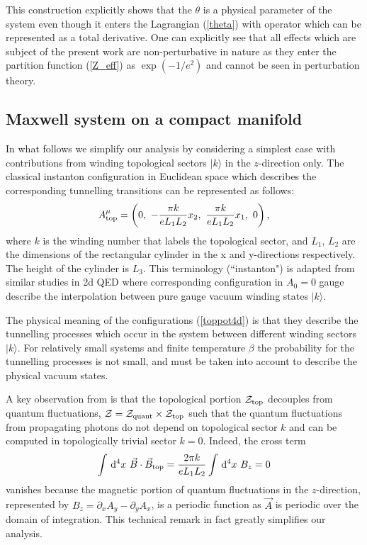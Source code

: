 \documentclass[ twocolumn,aps,prd,   
               preprintnumbers,numbers,sort&compress,nofootinbib,
                            showpacs,superscriptaddress,
               colorlinks,
               linkcolor=blue,   
               citecolor=blue]{revtex4-1}   \newcommand{\exclude}[1]{}
\newcommand{\be}{\begin{eqnarray}}
\newcommand{\ee}{\end{eqnarray}}
\def\dd{ \,\mathrm{d} }
\def\ra{\rangle}
\begin{document}
This construction explicitly shows that
the $\theta$ is a physical parameter of the system even though it enters the Lagrangian (\ref{theta}) with operator which can be represented as a total derivative. One can explicitly see that all effects which are subject of the present work are non-perturbative in nature as they enter the partition function (\ref{Z_eff}) as $\exp(-1/e^2)$ and cannot be seen in perturbation theory. 
 
 
  \subsection{Maxwell system on a compact manifold}\label{construction}
  

 In what follows we simplify our analysis by considering   a simplest  case with contributions from winding topological sectors $|k\ra$    in the $z$-direction only.  The classical instanton configuration in Euclidean space  which describes the corresponding tunnelling transitions can be represented as follows:
\be
\label{toppot4d}
A^{\mu}_{\rm top} = \left(0 ,~ -\frac{\pi k}{e L_{1} L_{2}} x_2 ,~ \frac{\pi k}{e L_{1} L_{2}} x_1 ,~ 0 \right),
\ee  
where $k$ is the winding number that labels the topological sector, and $L_{1}$, $L_{2}$ are the dimensions of the rectangular cylinder in the x and y-directions respectively. The height of the cylinder is $L_3$. This terminology (``instanton") is adapted   from  similar 
 studies in 2d QED    \cite{Cao:2013na} where corresponding configuration in $A_0=0$ gauge describe the interpolation between pure gauge vacuum winding states $|k\ra$.  
 
 The physical meaning of the configurations (\ref{toppot4d}) is that they describe the tunnelling processes which occur in the system between different winding   sectors $|k\ra$. For relatively small systems and finite temperature $\beta$ the probability for the tunnelling processes is not small, and must be taken into account to describe  the physical vacuum states.   
 
  
A key observation from \cite{Cao:2013na} is that the  topological portion ${\cal{Z}}_{\rm top}$   decouples from quantum fluctuations,  ${\cal{Z}} = {\cal{Z}}_{\rm quant} \times {\cal{Z}}_{\rm top}$ such that the quantum fluctuations from propagating photons do not depend on topological sector $k$ and can be computed in topologically trivial sector $k=0$.
Indeed,  the cross term 
\be
\int \dd^4 x~ \vec{B} \cdot \vec{B}_{\rm top} = \frac{2 \pi k}{e L_{1} L_{2}} \int \dd^4 x~ B_{z} = 0 
\label{decouple}
\ee
vanishes  because the magnetic portion of quantum fluctuations in the $z$-direction, represented by $B_{z} = \partial_{x} A_{y}  - \partial_{y} A_{x} $, is a periodic function as   $\vec{A} $ is periodic over the domain of integration. This technical remark in fact greatly simplifies our  analysis.
  
\end{document}

